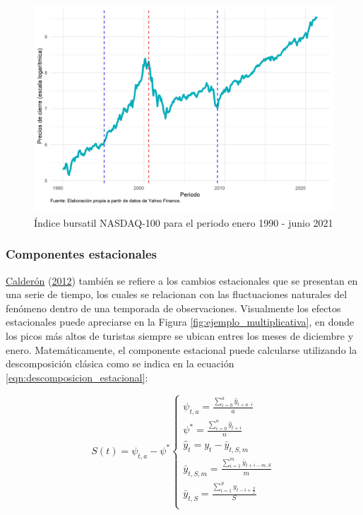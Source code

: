 \documentclass[
]{article}
\begin{document}
\begin{figure}[H]
\includegraphics[width=1\linewidth,height=1\textheight]{Tesis_files/figure-latex/ejemplo_ciclo-1} \caption{Índice bursatil NASDAQ-100 para el periodo enero 1990 - junio 2021}\label{fig:ejemplo_ciclo}
\end{figure}

\subsubsection{Componentes estacionales}

\protect\hyperlink{ref-calderon2012estadistica}{Calderón}
(\protect\hyperlink{ref-calderon2012estadistica}{2012}) también se
refiere a los cambios estacionales que se presentan en una serie de
tiempo, los cuales se relacionan con las fluctuaciones naturales del
fenómeno dentro de una temporada de observaciones. Visualmente los
efectos estacionales puede apreciarse en la Figura
\ref{fig:ejemplo_multiplicativa}, en donde los picos más altos de
turistas siempre se ubican entres los meses de diciembre y enero.
Matemáticamente, el componente estacional puede calcularse utilizando la
descomposición clásica como se indica en la ecuación
\ref{eqn:descomposicion_estacional}:

\begin{equation}
\label{eqn:descomposicion_estacional}
S(t)=\psi_{t,a}-\psi^*
\begin{cases}
\psi_{t,a} = \frac{\sum_{i=0}^a \hat{y}_{t+a\cdot i}}{a} \\
\psi^*=\frac{\sum_{i=0}^n \hat{y}_{t+i}}{n} \\
\hat{y}_t=y_t-\bar{y}_{t,S,m} \\
\bar{y}_{t,S,m}=\frac{\sum_{i=1}^m \bar{y}_{t+i-m,S}}{m} \\
\bar{y}_{t,S}=\frac{\sum_{i=1}^S y_{t-i+\frac{S}{2}}}{S} \\
\end{cases}
\end{equation}
\end{document}

